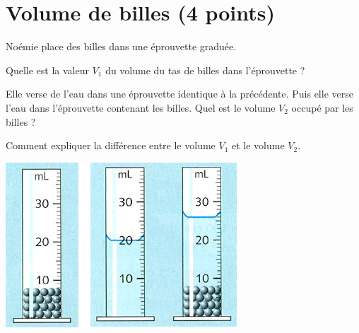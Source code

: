 \section{Volume de billes (4 points)}


\begin{multicols}{2}
	

Noémie place des billes dans une éprouvette graduée.

\begin{questions}
	\question[1] Quelle est la valeur $V_1$ du volume du tas de billes dans l'éprouvette ? 
	
	\question[1\half] Elle verse de l'eau dans une éprouvette identique à la précédente. Puis elle verse l'eau dans l'éprouvette contenant les billes. Quel est le volume $V_2$ occupé par les billes ?
	
	\question[1\half] Comment expliquer la différence entre le volume $V_1$ et le volume $V_2$.
\end{questions}


\begin{center}
	\includegraphics[scale=0.9]{img/billes}
\end{center}
\end{multicols}